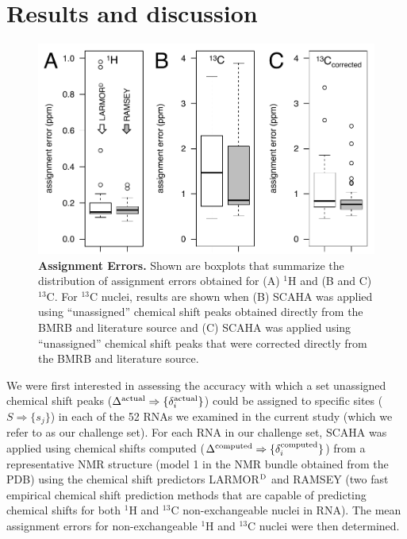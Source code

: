 \documentclass[journal=jcisd8,manuscript=article,layout=onecolumn]{achemso}
\begin{document}
\section{Results and discussion}
\begin{figure}[h!]
  \centering
       \includegraphics[width=1.0\textwidth]{figure_1}
  \caption{\textbf{Assignment Errors.} Shown are boxplots that summarize the distribution of assignment errors obtained for (A) $^{1}$H and (B and C) $^{13}$C. For $^{13}$C nuclei, results are shown when (B) SCAHA was applied using ``unassigned'' chemical shift peaks obtained directly from the BMRB and literature source and (C) SCAHA was applied using ``unassigned'' chemical shift peaks that were corrected  directly from the BMRB and literature source.}
  \label{fig:bar}
\end{figure}

We were first interested in assessing the accuracy with which a set unassigned chemical shift peaks ($\Delta^{\rm actual}\Rightarrow\{\delta_{i}^{\rm actual}\}$) could be assigned to specific sites ($S\Rightarrow\{s_{j}\}$) in each of the 52 RNAs we examined in the current study (which we refer to as our challenge set). For each RNA in our challenge set, SCAHA was applied using chemical shifts computed ($\Delta^{\rm computed}\Rightarrow\{\delta_{i}^{\rm computed}\}$) from a representative NMR structure (model 1 in the NMR bundle obtained from the PDB) using the chemical shift predictors LARMOR$^{\rm D}$ and RAMSEY  (two fast empirical chemical shift prediction methods  that are capable of predicting chemical shifts for both $^{1}$H and $^{13}$C non-exchangeable nuclei in RNA). The mean assignment errors for non-exchangeable $^{1}$H and $^{13}$C nuclei were then determined.
	
\end{document}
